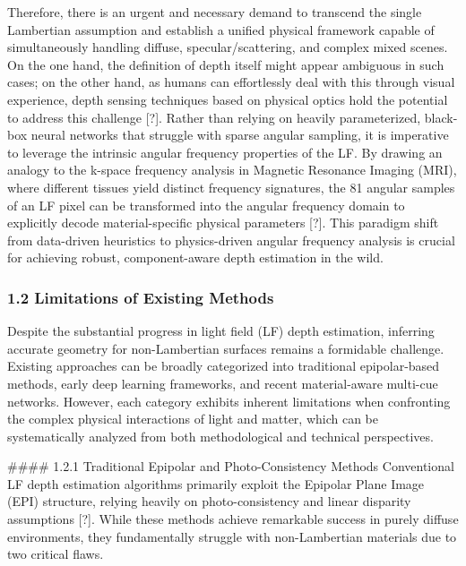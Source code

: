 \documentclass[journal]{IEEEtran}
\begin{document}
Therefore, there is an urgent and necessary demand to transcend the single Lambertian assumption and establish a unified physical framework capable of simultaneously handling diffuse, specular/scattering, and complex mixed scenes. On the one hand, the definition of depth itself might appear ambiguous in such cases; on the other hand, as humans can effortlessly deal with this through visual experience, depth sensing techniques based on physical optics hold the potential to address this challenge [?]. Rather than relying on heavily parameterized, black-box neural networks that struggle with sparse angular sampling, it is imperative to leverage the intrinsic angular frequency properties of the LF. By drawing an analogy to the k-space frequency analysis in Magnetic Resonance Imaging (MRI), where different tissues yield distinct frequency signatures, the 81 angular samples of an LF pixel can be transformed into the angular frequency domain to explicitly decode material-specific physical parameters [?]. This paradigm shift from data-driven heuristics to physics-driven angular frequency analysis is crucial for achieving robust, component-aware depth estimation in the wild.

\subsubsection{1.2 Limitations of Existing Methods}

Despite the substantial progress in light field (LF) depth estimation, inferring accurate geometry for non-Lambertian surfaces remains a formidable challenge. Existing approaches can be broadly categorized into traditional epipolar-based methods, early deep learning frameworks, and recent material-aware multi-cue networks. However, each category exhibits inherent limitations when confronting the complex physical interactions of light and matter, which can be systematically analyzed from both methodological and technical perspectives.

\#\#\#\# 1.2.1 Traditional Epipolar and Photo-Consistency Methods
Conventional LF depth estimation algorithms primarily exploit the Epipolar Plane Image (EPI) structure, relying heavily on photo-consistency and linear disparity assumptions [?]. While these methods achieve remarkable success in purely diffuse environments, they fundamentally struggle with non-Lambertian materials due to two critical flaws. 
\end{document}
